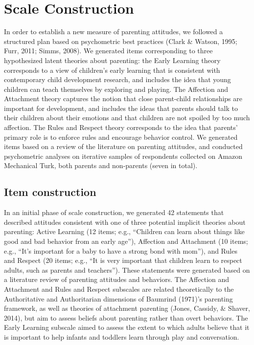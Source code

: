 \documentclass[10pt, letterpaper]{article}
\begin{document}
\section{Scale Construction}\label{scale-construction}

In order to establish a new measure of parenting attitudes, we followed
a structured plan based on psychometric best practices (Clark \& Watson,
1995; Furr, 2011; Simms, 2008). We generated items corresponding to
three hypothesized latent theories about parenting: the Early Learning
theory corresponds to a view of children's early learning that is
consistent with contemporary child development research, and includes
the idea that young children can teach themselves by exploring and
playing. The Affection and Attachment theory captures the notion that
close parent-child relationships are important for development, and
includes the ideas that parents should talk to their children about
their emotions and that children are not spoiled by too much affection.
The Rules and Respect theory corresponds to the idea that parents'
primary role is to enforce rules and encourage behavior control. We
generated items based on a review of the literature on parenting
attitudes, and conducted psychometric analyses on iterative samples of
respondents collected on Amazon Mechanical Turk, both parents and
non-parents (seven in total).

\subsection{Item construction}\label{item-construction}

In an initial phase of scale construction, we generated 42 statements
that described attitudes consistent with one of three potential implicit
theories about parenting: Active Learning (12 items; e.g., ``Children
can learn about things like good and bad behavior from an early age''),
Affection and Attachment (10 items; e.g., ``It's important for a baby to
have a strong bond with mom''), and Rules and Respect (20 items; e.g.,
``It is very important that children learn to respect adults, such as
parents and teachers''). These statements were generated based on a
literature review of parenting attitudes and behaviors. The Affection
and Attachment and Rules and Respect subscales are related theoretically
to the Authoritative and Authoritarian dimensions of Baumrind (1971)'s
parenting framework, as well as theories of attachment parenting (Jones,
Cassidy, \& Shaver, 2014), but aim to assess beliefs about parenting
rather than overt behaviors. The Early Learning subscale aimed to assess
the extent to which adults believe that it is important to help infants
and toddlers learn through play and conversation.
\end{document}
